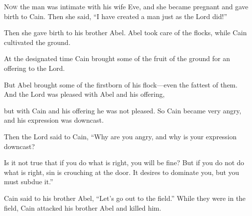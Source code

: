 \begin{scripture}
 \allowchapbreak\hypertarget{ch-genesis-4}{}\lettrine[lines=5]{\color{pentateuch}N}{\textsc{ow}} the man was intimate with his wife Eve, and she became pregnant and gave birth to Cain. Then she said, ``I have created a man just as the Lord did!''\everypar{}
 Then she gave birth to his brother Abel. Abel took care of the flocks, while Cain cultivated the ground.
\\\indent{} At the designated time Cain brought some of the fruit of the ground for an offering to the Lord.
 But Abel brought some of the firstborn of his flock---even the fattest of them. And the Lord was pleased with Abel and his offering,
 but with Cain and his offering he was not pleased. So Cain became very angry, and his expression was downcast.
\everypar{}

 Then the Lord said to Cain, ``Why are you angry, and why is your expression downcast?
 Is it not true that if you do what is right, you will be fine? But if you do not do what is right, sin is crouching at the door. It desires to dominate you, but you must subdue it.''
\everypar{}

 Cain said to his brother Abel, ``Let's go out to the field.'' While they were in the field, Cain attacked his brother Abel and killed him.
\everypar{}


\end{scripture}
